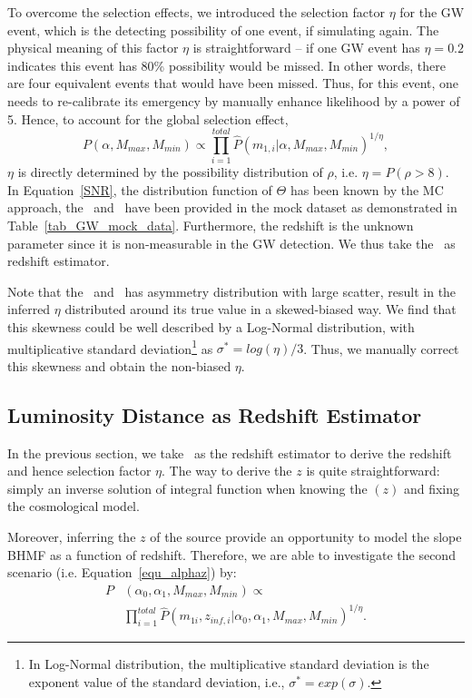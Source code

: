 \documentclass[twocolumn]{aastex62}
\begin{document}
To overcome the selection effects, we introduced the selection factor $\eta$ for the GW event, which is the detecting possibility of one event, if simulating again. The physical meaning of this factor $\eta$ is straightforward -- if one GW event has $\eta=0.2$ indicates this event has 80\% possibility would be missed. In other words, there are four equivalent events that would have been missed. Thus, for this event, one needs to re-calibrate its emergency by manually enhance likelihood by a power of 5. Hence, to account for the global selection effect, 
 \begin{equation} \label{equ_lik_sf}
 P(\alpha, M_{max}, M_{min}) \propto  \prod_{i=1}^{total} \hat{P}(m_{1,i}|\alpha, M_{max}, M_{min})^{1/\eta},
 \end{equation}
$\eta$ is directly determined by the possibility distribution of $\rho$, i.e. $\eta = P(\rho>8)$. In Equation~\ref{SNR}, the distribution function of $\Theta$ has been known by the MC approach, the \cmass\ and \dl\ have been provided in the mock dataset as demonstrated in Table~\ref{tab_GW_mock_data}. Furthermore, the redshift is the unknown parameter since it is non-measurable in the GW detection. We thus take the \dl\ as redshift estimator.

Note that the \dl\ and \cmass\ has asymmetry distribution with large scatter, result in the inferred $\eta$ distributed around its true value in a skewed-biased way. We find that this skewness could be well described by a Log-Normal distribution, with multiplicative standard deviation\footnote{In Log-Normal distribution, the multiplicative standard deviation is the exponent value of the standard deviation, i.e., $\sigma^* = exp(\sigma)$.} as $\sigma^*=log(\eta)/3$. Thus, we manually correct this skewness and obtain the non-biased $\eta$.

\subsection{Luminosity Distance as Redshift Estimator} 
\label{sec_dl_z}
In the previous section, we take \dl\ as the redshift estimator to derive the redshift and hence selection factor $\eta$. The way to derive the $z$ is quite straightforward: simply an inverse solution of integral function when knowing the \dl$(z)$ and fixing the cosmological model.

Moreover, inferring the $z$ of the source provide an opportunity to model the slope BHMF as a function of redshift. Therefore, we are able to investigate the second scenario (i.e. Equation~\ref{equ_alphaz}) by:
 \begin{equation} \label{equ_lik_alphaz}
 \begin{split}
 P&(\alpha_0, \alpha_1, M_{max}, M_{min}) \propto \\
  &\prod_{i=1}^{total} \hat{P}(m_{1i}, z_{inf,i} |\alpha_0, \alpha_1, M_{max}, M_{min})^{1/\eta}.
  \end{split}
 \end{equation}
 
\end{document}
